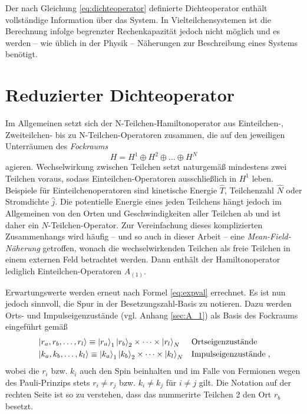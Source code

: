 Der nach Gleichung \eqref{eq:dichteoperator} definierte Dichteoperator enthält vollständige Information über das System. In Vielteilchensystemen ist die Berechnung infolge begrenzter Rechenkapazität jedoch nicht möglich und es werden -- wie üblich in der Physik -- Näherungen zur Beschreibung eines Systems benötigt.

\section{Reduzierter Dichteoperator}
Im Allgemeinen setzt sich der N-Teilchen-Hamiltonoperator aus Einteilchen-, Zweiteilchen- bis zu N-Teilchen-Operatoren zusammen, die auf den jeweiligen Unterräumen des \emph{Fockraums} 
\begin{equation*}
  H = H^1 \oplus H^2 \oplus \dots \oplus H^N
\end{equation*}
agieren. Wechselwirkung zwischen Teilchen setzt naturgemäß mindestens zwei Teilchen voraus, sodass Einteilchen-Operatoren ausschließlich in $H^1$ leben. Beispiele für Einteilchenoperatoren sind kinetische Energie $\hat{T}$, Teilchenzahl $\hat{N}$ oder Stromdichte $\hat{j}$. Die potentielle Energie eines jeden Teilchens hängt jedoch im Allgemeinen von den Orten und Geschwindigkeiten aller Teilchen ab und ist daher ein $N$-Teilchen-Operator. Zur Vereinfachung dieses komplizierten Zusammenhangs wird häufig -- und so auch in dieser Arbeit -- eine  \emph{Mean-Field-Näherung} getroffen, wonach die wechselwirkenden Teilchen als freie Teilchen in einem externen Feld betrachtet werden. Dann enthält der Hamiltonoperator lediglich Einteilchen-Operatoren $\hat{A}_{(1)}$.

Erwartungswerte werden erneut nach Formel \eqref{eq:expval} errechnet. Es ist nun jedoch sinnvoll, die Spur in der Besetzungszahl-Basis zu notieren. Dazu werden Orts- und Impulseigenzustände (vgl. Anhang \ref{sec:A_1}) als Basis des Fockraums eingeführt gemäß
\begin{align*}
  &\ket{r_a,r_b, \dots, r_l} \equiv \ket{r_a}_1 \ket{r_b}_2 \times \dots \times \ket{r_l}_N  & &\text{Ortseigenzustände} \\
  &\ket{k_a,k_b, \dots, k_l} \equiv \ket{k_a}_1 \ket{k_b}_2 \times \dots \times \ket{k_l}_N  & &\text{Impulseigenzustände} \; ,
\end{align*}
wobei die $r_i$ bzw. $k_i$ auch den Spin beinhalten und im Falle von Fermionen wegen des Pauli-Prinzips stets $r_i\neq r_j$ bzw. $k_i \neq k_j$ für $i\neq j$ gilt. Die Notation auf der rechten Seite ist so zu verstehen, dass das nummerirte Teilchen 2 den Ort $r_b$ besetzt.

